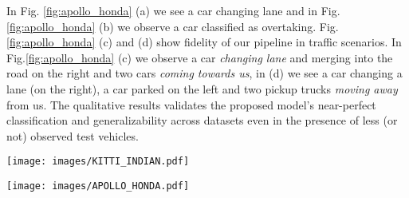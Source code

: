 \documentclass[letterpaper, 10 pt, conference]{ieeeconf}
\begin{document}
In Fig. \ref{fig:apollo_honda} (a) we see a car changing lane and in Fig. \ref{fig:apollo_honda} (b) we observe a car classified as overtaking. Fig. \ref{fig:apollo_honda} (c) and (d) show fidelity of our pipeline in traffic scenarios. In Fig.\ref{fig:apollo_honda} (c) we observe a car \textit{changing lane} and merging into the road on the right and two cars \textit{coming towards us}, in (d) we see a car changing a lane (on the right), a car parked on the left and two pickup trucks \textit{moving away} from us. The qualitative results validates the proposed model's near-perfect classification and generalizability across datasets even in the presence of less (or not) observed test vehicles. 
\begin{figure*}
\vspace{2mm}
\centering
\texttt{[image: images/KITTI\_INDIAN.pdf]}
    \caption{\scriptsize 
Sub-figures (a) and (b) showcases prediction on standard vehicles from KITTI dataset. Whereas in (c), we can see Petrol Tanker and Bus's behavior predictions from the Indian dataset that shows object class-agnosticism. In (d), we can see a complex lane changes behavior prediction.}
    \label{fig:kitti_indian}
\end{figure*}

\begin{figure*}
\centering
\texttt{[image: images/APOLLO\_HONDA.pdf]}
    \caption{\scriptsize The figure shows multiple scenarios depicting various behaviors. (a), (b) are samples from ApolloScapes dataset while (c) and (d) are from Honda dataset. In (a), (c), and (d), we observe the model accurately classifying lane change, both left to right and right to left. (b) depicts a case where the magenta car overtakes the red car.}
    \vspace{-3mm}
    \label{fig:apollo_honda}
\end{figure*}
\end{document}
